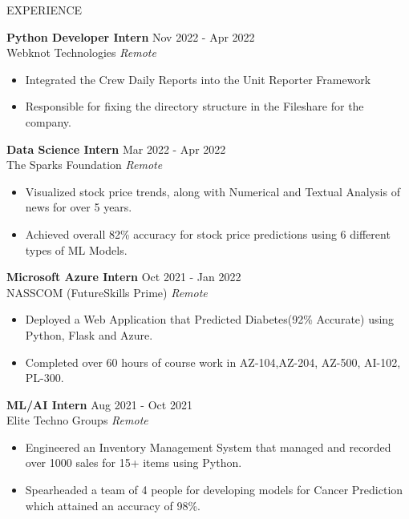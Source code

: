\documentclass{resume} %
\begin{document}
\begin{rSection}{EXPERIENCE}

\textbf{Python Developer Intern} \hfill Nov 2022 - Apr 2022\\
Webknot Technologies \hfill \textit{Remote}
 \begin{itemize}
    \itemsep -2pt {} 
     \item Integrated the Crew Daily Reports into the Unit Reporter Framework
    \item Responsible for fixing the directory structure in the Fileshare for the company.
 \end{itemize}

\textbf{Data Science Intern} \hfill Mar 2022 - Apr 2022\\
The Sparks Foundation \hfill \textit{Remote}
 \begin{itemize}
    \itemsep -2pt {} 
    \item Visualized stock price trends, along with Numerical and Textual Analysis of news for over 5 years. 
    \item Achieved overall 82\% accuracy for stock price predictions using 6 different types of ML Models.
 \end{itemize}
 
\textbf{Microsoft Azure Intern} \hfill Oct 2021 - Jan 2022\\
NASSCOM (FutureSkills Prime) \hfill \textit{Remote}
 \begin{itemize}
    \itemsep -2pt {} 
     \item Deployed a Web Application that Predicted Diabetes(92\% Accurate) using Python, Flask and Azure.
     \item Completed over 60 hours of course work in AZ-104,AZ-204, AZ-500, AI-102, PL-300.
 \end{itemize}

\textbf{ML/AI Intern} \hfill Aug 2021 - Oct 2021\\
Elite Techno Groups \hfill \textit{Remote}
 \begin{itemize}
    \itemsep -2pt {} 
     \item Engineered an Inventory Management System that managed and recorded over 1000 sales for 15+ items using Python.
     \item Spearheaded a team of 4 people for developing models for Cancer Prediction which attained an accuracy of 98\%.
 \end{itemize}

\end{rSection} 
\end{document}
